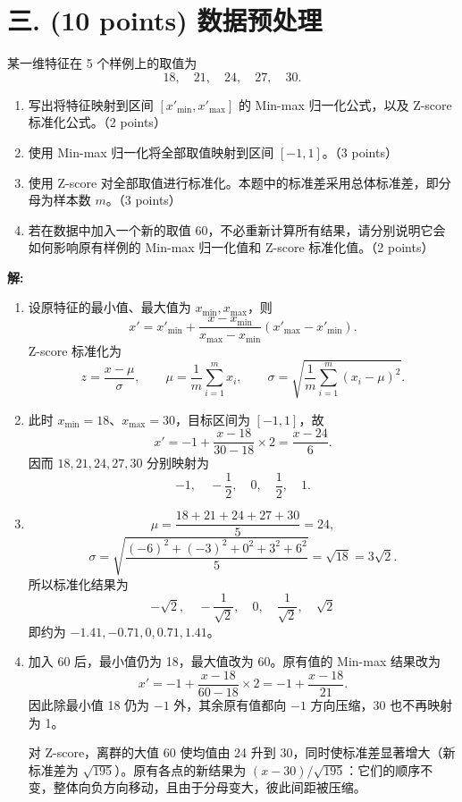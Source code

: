 \documentclass[8pt]{article}
\newcommand{\ans}{\par\noindent\textbf{\large 解:}\par}
\begin{document}
\clearpage
\section*{三. (10 points) 数据预处理}

某一维特征在 5 个样例上的取值为
\[
18,\quad 21,\quad 24,\quad 27,\quad 30.
\]

\begin{enumerate}[leftmargin=2.2em,itemsep=0.55em]
  \item 写出将特征映射到区间 $[x'_{\min},x'_{\max}]$ 的 Min-max 归一化公式，以及 Z-score 标准化公式。（2 points）
  \item 使用 Min-max 归一化将全部取值映射到区间 $[-1,1]$。（3 points）
  \item 使用 Z-score 对全部取值进行标准化。本题中的标准差采用总体标准差，即分母为样本数 $m$。（3 points）
  \item 若在数据中加入一个新的取值 60，不必重新计算所有结果，请分别说明它会如何影响原有样例的 Min-max 归一化值和 Z-score 标准化值。（2 points）
\end{enumerate}

\ans
\begin{enumerate}[leftmargin=2.2em,itemsep=0.85em]
\item 设原特征的最小值、最大值为 $x_{\min},x_{\max}$，则
\[
x'=x'_{\min}+\frac{x-x_{\min}}{x_{\max}-x_{\min}}
\left(x'_{\max}-x'_{\min}\right).
\]
Z-score 标准化为
\[
z=\frac{x-\mu}{\sigma},\qquad
\mu=\frac1m\sum_{i=1}^{m}x_i,\qquad
\sigma=\sqrt{\frac1m\sum_{i=1}^{m}(x_i-\mu)^2}.
\]

\item 此时 $x_{\min}=18$、$x_{\max}=30$，目标区间为 $[-1,1]$，故
\[
x'=-1+\frac{x-18}{30-18}\times2=\frac{x-24}{6}.
\]
因而 $18,21,24,27,30$ 分别映射为
\[
-1,\quad-\frac12,\quad0,\quad\frac12,\quad1.
\]

\item
\[
\mu=\frac{18+21+24+27+30}{5}=24,
\]
\[
\sigma=\sqrt{\frac{(-6)^2+(-3)^2+0^2+3^2+6^2}{5}}
=\sqrt{18}=3\sqrt2.
\]
所以标准化结果为
\[
-\sqrt2,\quad-\frac1{\sqrt2},\quad0,\quad\frac1{\sqrt2},\quad\sqrt2
\]
即约为 $-1.41,-0.71,0,0.71,1.41$。

\item 加入 60 后，最小值仍为 18，最大值改为 60。原有值的 Min-max 结果改为
\[
x'=-1+\frac{x-18}{60-18}\times2=-1+\frac{x-18}{21}.
\]
因此除最小值 18 仍为 $-1$ 外，其余原有值都向 $-1$ 方向压缩，30 也不再映射为 1。

对 Z-score，离群的大值 60 使均值由 24 升到 30，同时使标准差显著增大（新标准差为 $\sqrt{195}$）。原有各点的新结果为 $(x-30)/\sqrt{195}$：它们的顺序不变，整体向负方向移动，且由于分母变大，彼此间距被压缩。
\end{enumerate}
\end{document}
